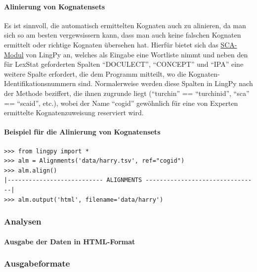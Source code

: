 \paragraph{Alinierung von Kognatensets}

Es ist sinnvoll, die automatisch ermittelten Kognaten auch zu alinieren,
da man sich so am besten vergewsissern kann, dass man auch keine
falschen Kognaten ermittelt oder richtige Kognaten übersehen hat.
Hierfür bietet sich das
\href{http://lingpy.org/reference/lingpy.align.html\#module-lingpy.align.sca}{SCA-Modul}
von LingPy an, welches als Eingabe eine Wortliste nimmt und neben den
für LexStat geforderten Spalten ``DOCULECT'', ``CONCEPT'' und ``IPA''
eine weitere Spalte erfordert, die dem Programm mitteilt, wo die
Kognaten-Identifikationsnummern sind. Normalerweise werden diese Spalten
in LingPy nach der Methode beziffert, die ihnen zugrunde liegt
(``turchin'' == ``turchinid'', ``sca'' == ``scaid'', etc.), wobei der
Name ``cogid'' gewöhnlich für eine von Experten ermittelte
Kognatenzuweisung reserviert wird.




\paragraph{Beispiel für die Alinierung von Kognatensets}

\begin{verbatim}
>>> from lingpy import *
>>> alm = Alignments('data/harry.tsv', ref="cogid")
>>> alm.align()
|--------------------------- ALIGNMENTS --------------------------------|
>>> alm.output('html', filename='data/harry')
\end{verbatim}



\subsubsection{\texorpdfstring{{Analysen}}{Analysen}}

\paragraph{Ausgabe der Daten in HTML-Format}



\subsubsection{\texorpdfstring{{Ausgabeformate}}{Ausgabeformate}}


